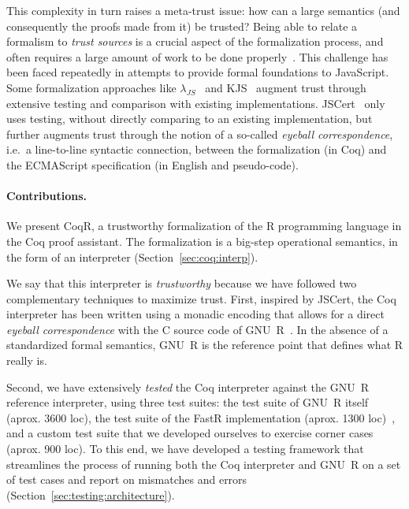 \documentclass[
    sigplan,
    10pt,
    review, %
    natbib=false %
 ]{acmart}
\newcommand\CoqR{CoqR}
\begin{document}
This complexity in turn raises a meta-trust issue: 
how can a large semantics (and consequently the proofs made from it)
be trusted? Being able to relate a formalism to {\em trust sources} is a crucial aspect of the formalization process, and often requires a large amount of work to be done properly~\parencite{leroy2014pip}. This challenge has been faced repeatedly in attempts to provide formal foundations to JavaScript.
%
Some formalization approaches like $\lambda_{JS}$~\cite{Guha2010} and KJS~\cite{kjs} augment trust through extensive testing and comparison with existing implementations. JSCert~\parencite{popl14jscert} only uses testing, without directly comparing to an existing implementation, but further augments trust through the notion of a so-called {\em eyeball correspondence}, i.e.~a line-to-line syntactic connection, between the formalization (in Coq) and the ECMAScript specification (in English and pseudo-code).

\paragraph{Contributions.} 
We present \CoqR{}, a trustworthy formalization of the R programming language in the Coq proof assistant.
The formalization is a big-step operational semantics, in the form of an interpreter (Section~\ref{sec:coq:interp}). 

We say that this interpreter is {\em trustworthy} because we have followed two complementary techniques to maximize trust.
First, inspired by JSCert, the Coq interpreter has been written using a monadic encoding that allows for a direct {\em eyeball correspondence} with the C source code of GNU~R~\parencite{Rwebsite}. In the absence of a standardized formal semantics, GNU~R is the reference point that defines what  R really is.

Second, we have extensively {\em tested} the Coq interpreter against the GNU~R reference interpreter, using three test suites: the test suite of GNU~R itself (aprox. 3600 loc), the test suite of the FastR implementation (aprox. 1300 loc)~\parencite{kalibera2014fast}, and a custom test suite that we developed ourselves to exercise corner cases (aprox. 900 loc). 
To this end, we have developed a testing framework that streamlines the process of running both the Coq interpreter and GNU~R on a set of test cases and report on mismatches and errors (Section~\ref{sec:testing:architecture}).
\end{document}
